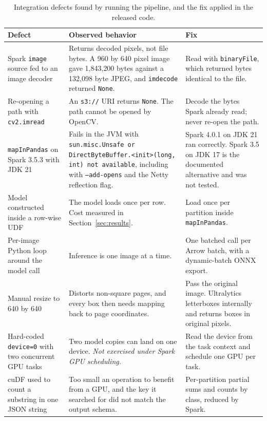 \begin{table}[t]
\centering
\caption{Integration defects found by running the pipeline, and the fix applied in the released code.}
\label{tab:defects}
\small
\begin{tabular}{@{}p{}p{}p{}@{}}
\toprule
Defect & Observed behavior & Fix \\
\midrule
Spark \texttt{image} source fed to an image decoder & Returns decoded pixels, not file bytes. A 960 by 640 pixel image gave 1{,}843{,}200 bytes against a 132{,}098 byte JPEG, and \texttt{imdecode} returned \texttt{None}. & Read with \texttt{binaryFile}, which returned bytes identical to the file. \\
Re-opening a path with \texttt{cv2.imread} & An \texttt{s3://} URI returns \texttt{None}. The path cannot be opened by OpenCV. & Decode the bytes Spark already read; never re-open the path. \\
\texttt{mapInPandas} on Spark 3.5.3 with JDK 21 & Fails in the JVM with \texttt{sun.misc.Unsafe or DirectByteBuffer.<init>(long, int) not available}, including with \texttt{--add-opens} and the Netty reflection flag. & Spark 4.0.1 on JDK 21 ran correctly. Spark 3.5 on JDK 17 is the documented alternative and was not tested. \\
Model constructed inside a row-wise UDF & The model loads once per row. Cost measured in Section~\ref{sec:results}. & Load once per partition inside \texttt{mapInPandas}. \\
Per-image Python loop around the model call & Inference is one image at a time. & One batched call per Arrow batch, with a dynamic-batch ONNX export. \\
Manual resize to 640 by 640 & Distorts non-square pages, and every box then needs mapping back to page coordinates. & Pass the original image. Ultralytics letterboxes internally and returns boxes in original pixels. \\
Hard-coded \texttt{device=0} with two concurrent GPU tasks & Two model copies can land on one device. \textit{Not exercised under Spark GPU scheduling.} & Read the device from the task context and schedule one GPU per task. \\
cuDF used to count a substring in one JSON string & Too small an operation to benefit from a GPU, and the key it searched for did not match the output schema. & Per-partition partial sums and counts by class, reduced by Spark. \\
\bottomrule
\end{tabular}
\end{table}

